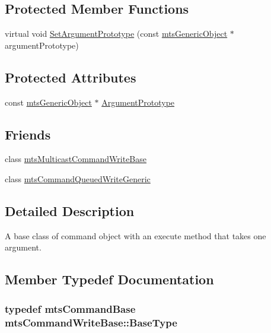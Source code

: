 \subsection*{Protected Member Functions}
\begin{DoxyCompactItemize}
\item 
virtual void \hyperlink{classmts_command_write_base_a1b369a356b5c2fb8ed3f5a72c3c521d1}{Set\-Argument\-Prototype} (const \hyperlink{classmts_generic_object}{mts\-Generic\-Object} $\ast$argument\-Prototype)
\end{DoxyCompactItemize}
\subsection*{Protected Attributes}
\begin{DoxyCompactItemize}
\item 
const \hyperlink{classmts_generic_object}{mts\-Generic\-Object} $\ast$ \hyperlink{classmts_command_write_base_a92e316a7f32f52a18b47a02867b104d2}{Argument\-Prototype}
\end{DoxyCompactItemize}
\subsection*{Friends}
\begin{DoxyCompactItemize}
\item 
class \hyperlink{classmts_command_write_base_a01bea616c1ae77f302ccedbbc1300c12}{mts\-Multicast\-Command\-Write\-Base}
\item 
class \hyperlink{classmts_command_write_base_aebd3531dc414cbd5c5aff710ecbfac4f}{mts\-Command\-Queued\-Write\-Generic}
\end{DoxyCompactItemize}


\subsection{Detailed Description}
A base class of command object with an execute method that takes one argument. 

\subsection{Member Typedef Documentation}
\hypertarget{classmts_command_write_base_a5d78c8590cfc73fa29d93b3678cba199}{
\subsubsection[{Base\-Type}]{\setlength{\rightskip}{0pt plus 5cm}typedef {\bf mts\-Command\-Base} {\bf mts\-Command\-Write\-Base\-::\-Base\-Type}}}\label{classmts_command_write_base_a5d78c8590cfc73fa29d93b3678cba199}


